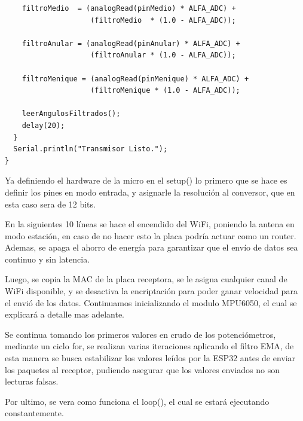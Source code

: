 \documentclass[10pt]{article}
\begin{document}
\begin{lstlisting}
    filtroMedio  = (analogRead(pinMedio) * ALFA_ADC) + 
                    (filtroMedio  * (1.0 - ALFA_ADC));
    
    filtroAnular = (analogRead(pinAnular) * ALFA_ADC) + 
                    (filtroAnular * (1.0 - ALFA_ADC));
   
    filtroMenique = (analogRead(pinMenique) * ALFA_ADC) + 
                    (filtroMenique * (1.0 - ALFA_ADC));
    
    leerAngulosFiltrados();
    delay(20); 
  }
  Serial.println("Transmisor Listo.");
}
\end{lstlisting}

Ya definiendo el hardware de la micro en el setup() lo primero que se hace es definir los pines en modo entrada, y asignarle la resolución al conversor, que en esta caso sera de 12 bits.

En la siguientes 10 líneas se hace el encendido del WiFi, poniendo la antena en modo estación, en caso de no hacer esto la placa podría actuar como un router. Ademas, se apaga el ahorro de energía para garantizar que el envío de datos sea continuo y sin latencia. 

Luego, se copia la MAC de la placa receptora, se le asigna cualquier canal de WiFi disponible, y se desactiva la encriptación para poder ganar velocidad  para el envió de los datos. Continuamos inicializando el modulo MPU6050, el cual se explicará a detalle mas adelante.

Se continua tomando los primeros valores en crudo de los potenciómetros, mediante un ciclo for, se realizan varias iteraciones aplicando el filtro EMA, de esta manera se busca estabilizar los valores leídos por la ESP32 antes de enviar los paquetes al receptor, pudiendo asegurar que los valores enviados no son lecturas falsas. 

Por ultimo, se vera como funciona el loop(), el cual se estará ejecutando constantemente. 
\end{document}
